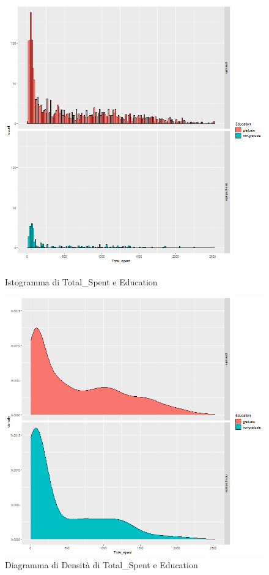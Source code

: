 \documentclass[letterpaper,11pt]{article}
\begin{document}
\begin{figure}[h]
  \centering
  \begin{minipage}[b]{0.4\textwidth}
    \includegraphics[width=\textwidth]{Img/EDA/EDA028.png}
    \caption{Istogramma di Total\_Spent e Education}
    \label{fig:IstogrammaTsEducation}
  \end{minipage}
  \hfill
  \begin{minipage}[b]{0.4\textwidth}
    \includegraphics[width=\textwidth]{Img/EDA/EDA029.png}
    \caption{Diagramma di Densità di Total\_Spent e Education}
     \label{fig:DensitaTsEducation}
  \end{minipage}
\end{figure}
\end{document}
